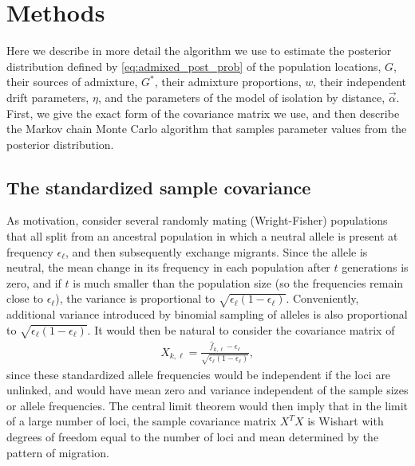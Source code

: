 \documentclass[10pt,letterpaper]{article}
\newcommand{\identifyadmixsource}[1]{{#1^{*}}}
\begin{document}
\section*{Methods}
Here we describe in more detail the algorithm we use to estimate the posterior distribution defined by \eqref{eq:admixed_post_prob} 
of the population locations, $G$, 
their sources of admixture, $\identifyadmixsource{G}$, 
their admixture proportions, $w$, 
their independent drift parameters, $\eta$, 
and the parameters of the model of isolation by distance, $\vec{\alpha}$.  
First, we give the exact form of the covariance matrix we use,
and then describe the Markov chain Monte Carlo algorithm 
that samples parameter values from the posterior distribution.


\subsection*{The standardized sample covariance}
\label{ss:cov_methods}

As motivation, consider several randomly mating (Wright-Fisher) populations
that all split from an ancestral population
in which a neutral allele is present at frequency $\epsilon_\ell$,
and then subsequently exchange migrants.
Since the allele is neutral, the mean change in its frequency in each population after $t$ generations is zero,
and if $t$ is much smaller than the population size (so the frequencies remain close to $\epsilon_\ell$), 
the variance is proportional to $\sqrt{\epsilon_\ell (1-\epsilon_\ell)}$.
Conveniently, additional variance introduced by binomial sampling of alleles
is also proportional to $\sqrt{\epsilon_\ell (1-\epsilon_\ell)}$.
It would then be natural to consider the covariance matrix of 
\begin{align}
  X_{k,\ell} = \frac{ \hat f_{k,\ell} - \epsilon_\ell }{ \sqrt{ \epsilon_\ell (1- \epsilon_\ell) } } ,
\end{align}
since these standardized allele frequencies would be independent if the loci are unlinked,
and would have mean zero and variance independent of the sample sizes or allele frequencies.
The central limit theorem would then imply that in the limit of a large number of loci, 
the sample covariance matrix $X^T X$ is Wishart with degrees of freedom equal to the number of loci
and mean determined by the pattern of migration.
\end{document}
